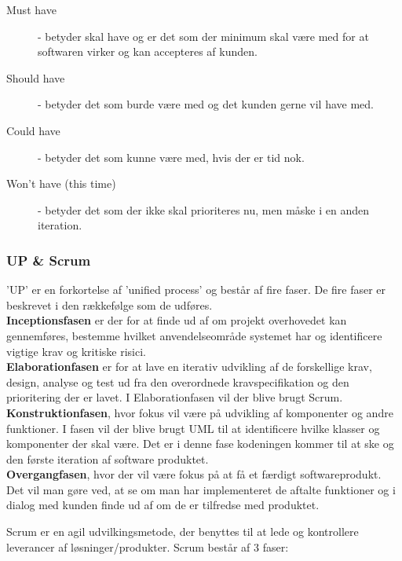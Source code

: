 \begin{description}
    \item [Must have] - betyder skal have og er det som der minimum skal være med for at softwaren virker og kan accepteres af kunden. 
    \item [Should have] - betyder det som burde være med og det kunden gerne vil have med.
    \item [Could have] - betyder det som kunne være med, hvis der er tid nok. 
    \item [Won't have (this time)] - betyder det som der ikke skal prioriteres nu, men måske i en anden iteration.
\end{description}


\subsubsection{UP \& Scrum}{\label{subsubsection: up_scrum}}

'UP' er en forkortelse af 'unified process' og består af fire faser. De fire faser er beskrevet i den rækkefølge som de udføres. \\


\textbf{Inceptionsfasen} er der for at finde ud af om projekt overhovedet kan gennemføres, bestemme hvilket anvendelseområde systemet har og identificere vigtige krav og kritiske risici. \\


\textbf{Elaborationfasen} er for at lave en iterativ udvikling af de forskellige krav, design, analyse og test ud fra den overordnede kravspecifikation og den prioritering der er lavet. I Elaborationfasen vil der blive brugt Scrum. \\


\textbf{Konstruktionfasen}, hvor fokus vil være på udvikling af komponenter og andre funktioner.
I fasen vil der blive brugt UML til at identificere hvilke klasser og komponenter der skal være. Det er i denne fase kodeningen kommer til at ske og den første iteration af software produktet.  \\


\textbf{Overgangfasen}, hvor der vil være fokus på at få et færdigt softwareprodukt.
Det vil man gøre ved, at se om man har implementeret de aftalte funktioner og i dialog med kunden finde ud af om de er tilfredse med produktet.

Scrum er en agil udvilkingsmetode, der benyttes til at lede og kontrollere leverancer af løsninger/produkter. Scrum består af 3 faser: 

